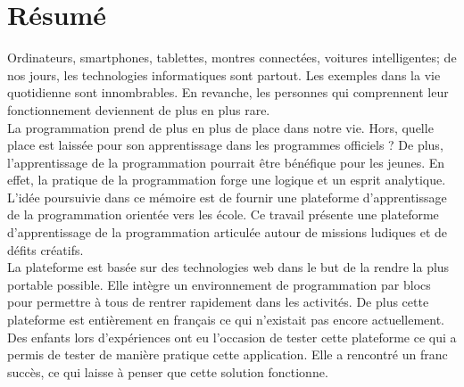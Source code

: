 \section*{Résumé}
Ordinateurs, smartphones, tablettes, montres connectées, voitures intelligentes; de nos jours, les technologies informatiques sont partout. Les exemples dans la vie quotidienne sont innombrables. En revanche, les personnes qui comprennent leur fonctionnement deviennent de plus en plus rare. \\

La programmation prend de plus en plus de place dans notre vie. Hors, quelle place est laissée pour son apprentissage dans les programmes officiels ? De plus, l'apprentissage de la programmation pourrait être bénéfique pour les jeunes. En effet, la pratique de la programmation forge une logique et un esprit analytique.\\

L'idée poursuivie dans ce mémoire est de fournir une plateforme d'apprentissage de la programmation orientée vers les école. Ce travail présente une plateforme d'apprentissage de la programmation articulée autour de missions ludiques et de défits créatifs.\\

La plateforme est basée sur des technologies web dans le but de la rendre la plus portable possible. Elle intègre un environnement de programmation par blocs pour permettre à tous de rentrer rapidement dans les activités. De plus cette plateforme est entièrement en français ce qui n'existait pas encore actuellement.\\

Des enfants lors d'expériences ont eu l'occasion de tester cette plateforme ce qui a permis de tester de manière pratique cette application. Elle a rencontré un franc succès, ce qui laisse à penser que cette solution fonctionne.


